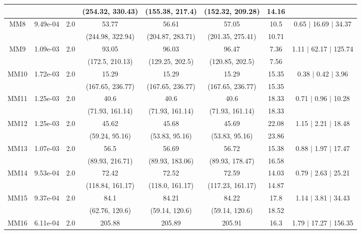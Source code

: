 \begin{longtable}{|c|c|c|c|c|c|c|c|}
	 &  &  & (254.32, 330.43) & (155.38, 217.4) & (152.32, 209.28) & 14.16 & \\
 	\hline
	\multirow{2}{*}{MM8} & \multirow{2}{*}{9.49e-04} & \multirow{2}{*}{2.0} & 53.77 & 56.61 & 57.05 & 10.5 & 0.65 $\mid$ 16.69 $\mid$ 34.37\\
	 &  &  & (244.98, 322.94) & (204.87, 283.71) & (201.35, 275.41) & 10.71 & \\
 	\hline
	\multirow{2}{*}{MM9} & \multirow{2}{*}{1.09e-03} & \multirow{2}{*}{2.0} & 93.05 & 96.03 & 96.47 & 7.36 & 1.11 $\mid$ 62.17 $\mid$ 125.74\\
	 &  &  & (172.5, 210.13) & (129.25, 202.5) & (120.85, 202.5) & 7.56 & \\
 	\hline
	\multirow{2}{*}{MM10} & \multirow{2}{*}{1.72e-03} & \multirow{2}{*}{2.0} & 15.29 & 15.29 & 15.29 & 15.35 & 0.38 $\mid$ 0.42 $\mid$ 3.96\\
	 &  &  & (167.65, 236.77) & (167.65, 236.77) & (167.65, 236.77) & 15.35 & \\
 	\hline
	\multirow{2}{*}{MM11} & \multirow{2}{*}{1.25e-03} & \multirow{2}{*}{2.0} & 40.6 & 40.6 & 40.6 & 18.33 & 0.71 $\mid$ 0.96 $\mid$ 10.28\\
	 &  &  & (71.93, 161.14) & (71.93, 161.14) & (71.93, 161.14) & 18.33 & \\
 	\hline
	\multirow{2}{*}{MM12} & \multirow{2}{*}{1.25e-03} & \multirow{2}{*}{2.0} & 45.62 & 45.68 & 45.69 & 22.08 & 1.15 $\mid$ 2.21 $\mid$ 18.48\\
	 &  &  & (59.24, 95.16) & (53.83, 95.16) & (53.83, 95.16) & 23.86 & \\
 	\hline
	\multirow{2}{*}{MM13} & \multirow{2}{*}{1.07e-03} & \multirow{2}{*}{2.0} & 56.5 & 56.69 & 56.72 & 15.38 & 0.88 $\mid$ 1.97 $\mid$ 17.47\\
	 &  &  & (89.93, 216.71) & (89.93, 183.06) & (89.93, 178.47) & 16.58 & \\
 	\hline
	\multirow{2}{*}{MM14} & \multirow{2}{*}{9.53e-04} & \multirow{2}{*}{2.0} & 72.42 & 72.52 & 72.59 & 14.03 & 0.79 $\mid$ 2.63 $\mid$ 25.21\\
	 &  &  & (118.84, 161.17) & (118.0, 161.17) & (117.23, 161.17) & 14.87 & \\
 	\hline
	\multirow{2}{*}{MM15} & \multirow{2}{*}{9.37e-04} & \multirow{2}{*}{2.0} & 84.1 & 84.21 & 84.22 & 17.8 & 1.14 $\mid$ 3.81 $\mid$ 34.43\\
	 &  &  & (62.76, 120.6) & (59.14, 120.6) & (59.14, 120.6) & 18.52 & \\
 	\hline
	\multirow{2}{*}{MM16} & \multirow{2}{*}{6.11e-04} & \multirow{2}{*}{2.0} & 205.88 & 205.89 & 205.91 & 16.3 & 1.79 $\mid$ 17.27 $\mid$ 156.35\\

\end{longtable}
